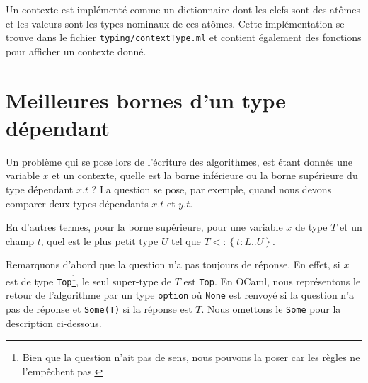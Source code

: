 Un contexte est implémenté comme un dictionnaire dont les clefs sont des atômes
et les valeurs sont les types nominaux de ces atômes. Cette implémentation se
trouve dans le fichier \verb|typing/contextType.ml| et contient également
des fonctions pour afficher un contexte donné.


%

\section{Meilleures bornes d'un type dépendant}

Un problème qui se pose lors de l'écriture des algorithmes, est étant donnés une variable
$x$ et un contexte, quelle est la borne inférieure ou la borne supérieure du
type dépendant $x.t$ ? La question se pose, par exemple, quand nous devons
comparer deux types dépendants $x.t$ et $y.t$.

En d'autres termes, pour la borne supérieure, pour une variable $x$ de type $T$ et
un champ $t$, quel est le plus petit type $U$ tel que $T <: \left\{ t : L .. U
\right\}$.

Remarquons d'abord que la question n'a pas toujours de réponse. En effet, si $x$
est de type \verb|Top|\footnote{Bien que la question n'ait pas de sens, nous
  pouvons la poser car les règles ne l'empêchent pas.}, le seul super-type de
$T$ est \verb|Top|. En OCaml, nous représentons le retour de l'algorithme par un
type \verb|option| où \verb|None| est renvoyé si la question n'a pas de réponse
et \verb|Some(T)| si la réponse est $T$. Nous omettons le \verb|Some| pour la
description ci-dessous.


